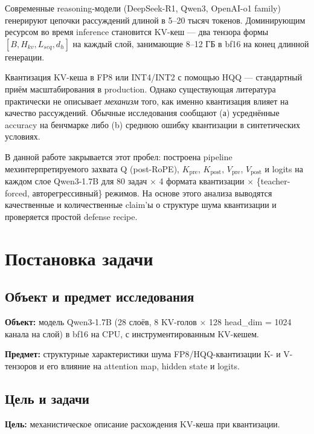 \documentclass[a4paper,12pt]{article}
\begin{document}
Современные reasoning-модели (DeepSeek-R1, Qwen3, OpenAI-o1 family) генерируют цепочки рассуждений длиной в 5--20 тысяч токенов. Доминирующим ресурсом во время inference становится KV-кеш --- два тензора формы $[B, H_{kv}, L_{seq}, d_h]$ на каждый слой, занимающие 8--12 ГБ в bf16 на конец длинной генерации.

Квантизация KV-кеша в FP8 \cite{micikevicius2022} или INT4/INT2 с помощью HQQ \cite{badri2023} --- стандартный приём масштабирования в production. Однако существующая литература практически не описывает \textit{механизм} того, как именно квантизация влияет на качество рассуждений. Обычные исследования сообщают (а) усреднённые accuracy на бенчмарке либо (b) среднюю ошибку квантизации в синтетических условиях.

В данной работе закрывается этот пробел: построена pipeline мехинтерпретируемого захвата Q (post-RoPE), $K_\text{pre}$, $K_\text{post}$, $V_\text{pre}$, $V_\text{post}$ и logits на каждом слое Qwen3-1.7B для 80 задач $\times$ 4 формата квантизации $\times$ \{teacher-forced, авторегрессивный\} режимов. На основе этого анализа выводятся качественные и количественные claim'ы о структуре шума квантизации и проверяется простой defense recipe.

\section{Постановка задачи}

\subsection{Объект и предмет исследования}
\textbf{Объект:} модель Qwen3-1.7B (28 слоёв, 8 KV-голов $\times$ 128 head\_dim = 1024 канала на слой) в bf16 на CPU, с инструментированным KV-кешем.

\textbf{Предмет:} структурные характеристики шума FP8/HQQ-квантизации K- и V-тензоров и его влияние на attention map, hidden state и logits.

\subsection{Цель и задачи}
\textbf{Цель:} механистическое описание расхождения KV-кеша при квантизации.
\end{document}
